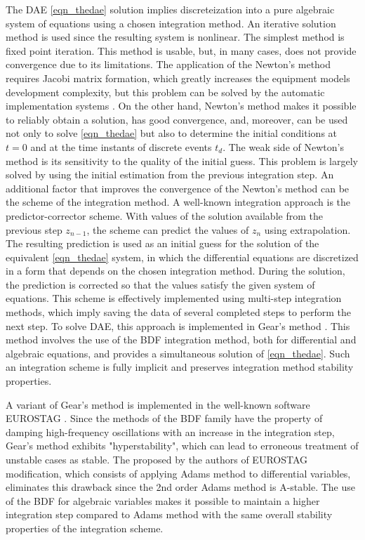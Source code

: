 \documentclass[lettersize,journal]{IEEEtran}
\begin{document}
The DAE \eqref{eqn_thedae} solution implies discreteization into a pure algebraic system of equations using a chosen integration method. An iterative solution method is used since the resulting system is nonlinear. The simplest method is fixed point iteration. This method is usable, but, in many cases, does not provide convergence due to its limitations. The application of the Newton's method requires Jacobi matrix formation, which greatly increases the equipment models development complexity, but this problem can be solved by the automatic implementation systems \cite{mycompiler}. On the other hand, Newton's method makes it possible to reliably obtain a solution, has good convergence, and, moreover, can be used not only to solve \eqref{eqn_thedae} but also to determine the initial conditions at \(t=0\) and at the time instants of discrete events \(t_d\). The weak side of Newton's method is its sensitivity to the quality of the initial guess. This problem is largely solved by using the initial estimation from the previous integration step. An additional factor that improves the convergence of the Newton's method can be the scheme of the integration method. A well-known integration approach is the predictor-corrector scheme. With values of the solution available from the previous step \(z_{n-1}\), the scheme can predict the values of \(z_n\) using extrapolation. The resulting prediction is used as an initial guess for the solution of the equivalent \eqref{eqn_thedae} system, in which the differential equations are discretized in a form that depends on the chosen integration method. During the solution, the prediction is corrected so that the values satisfy the given system of equations. This scheme is effectively implemented using multi-step integration methods, which imply saving the data of several completed steps to perform the next step. To solve DAE, this approach is implemented in Gear's method \cite{gear71}. This method involves the use of the BDF integration method, both for differential and algebraic equations, and provides a simultaneous solution of \eqref{eqn_thedae}. Such an integration scheme is fully implicit and preserves integration method stability properties.

A variant of Gear's method is implemented in the well-known software EUROSTAG \cite{mixedadams}. Since the methods of the BDF family have the property of damping high-frequency oscillations with an increase in the integration step, Gear's method exhibits "hyperstability", which can lead to erroneous treatment of unstable cases as stable. The proposed by the authors of EUROSTAG modification, which consists of applying Adams method to differential variables, eliminates this drawback since the 2nd order Adams method is A-stable. The use of the BDF for algebraic variables makes it possible to maintain a higher integration step compared to Adams method with the same overall stability properties of the integration scheme.
\end{document}
